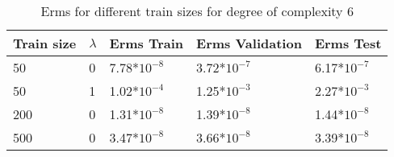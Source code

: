 \begin{table}[H]
\centering
\begin{tabular}{l l l l l}
\hline
\hline
\textbf{Train size} & \textbf{$\lambda$} & \textbf{Erms Train} & \textbf{Erms Validation} & \textbf{Erms Test}\\
\hline
\hline
50 & 0 & 7.78*$10^{-8}$ & 3.72*$10^{-7}$ & 6.17*$10^{-7}$  \\
50 & 1 & 1.02*$10^{-4}$ & 1.25*$10^{-3}$ & 2.27*$10^{-3}$ \\
200 & 0 & 1.31*$10^{-8}$ & 1.39*$10^{-8}$ & 1.44*$ 10^{-8}$  \\
500 & 0 & 3.47*$10^{-8}$ & 3.66*$10^{-8}$ & 3.39*$10^{-8}$\\
\hline
\end{tabular}
\caption{Erms for different train sizes for degree of complexity 6}
\end{table}

